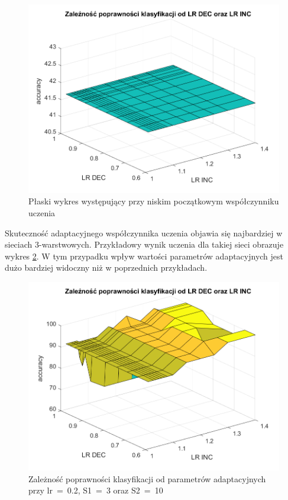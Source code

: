 \documentclass[12pt,twoside]{article}
\begin{document}
\begin{figure}[ht]
	\centering
	\includegraphics[width=16cm]{figures/IncDec_4.png}
	\caption{Płaski wykres występujący przy niskim początkowym współczynniku uczenia}
	\label{Fig:IncDec4}
\end{figure}

Skuteczność adaptacyjnego współczynnika uczenia objawia się najbardziej w sieciach 3-warstwowych.
Przykładowy wynik uczenia dla takiej sieci obrazuje wykres \ref{Fig:IncDec5}.
W tym przypadku wpływ wartości parametrów adaptacyjnych jest dużo bardziej widoczny niż w poprzednich przykładach.

\begin{figure}[ht]
	\centering
	\includegraphics[width=16cm]{figures/IncDec_5.png}
	\caption{Zależność poprawności klasyfikacji od parametrów adaptacyjnych przy lr~=~0.2, S1~=~3 oraz S2~=~10}
	\label{Fig:IncDec5}
\end{figure}
\end{document}
